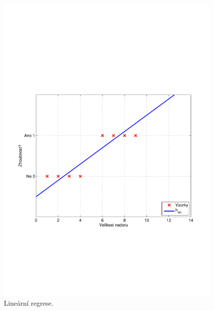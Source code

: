 {\begin{figure}[!ht]
	\centering
	\begin{minipage}[b]{0.48\textwidth}
		\includegraphics[width = \textwidth, trim = 2.5cm 7cm 2cm 9cm]{./Img/BinarniRegrese/prikladNadory/tumor_2st_example.pdf}
		\caption{Lineární regrese. \\ ~}
		\label{fig:nadory2}
	\end{minipage}%
	\hfill
	\begin{minipage}[b]{0.48\textwidth}

\end{minipage}
\end{figure}}
